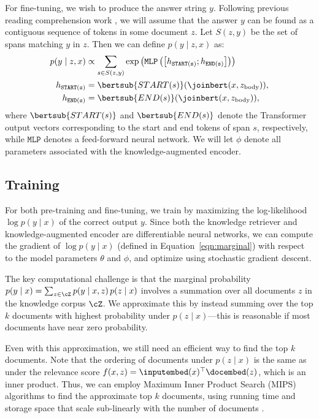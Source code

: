 For \openqa fine-tuning, we wish to produce the answer string $y$. Following previous reading comprehension work \cite{squad,bidaf,rasor,bidaf_plusplus}, we will assume that the answer $y$ can be found as a contiguous sequence of tokens in some document $z$.
Let $S(z, y)$ be the set of spans matching $y$ in $z$. Then we can define $p(y \mid z,x)$ as:
\begin{align*}
p(y \mid z, x)  &\propto \sum_{s \in S(z, y)} \exp\left(\mathtt{MLP}\left(\left[h_{\mathtt{START(s)}} ; h_{\mathtt{END(s)}}\right]\right)\right)\\
h_{\mathtt{START(s)}} &= \bertsub{START(s)}(\joinbert(x, z_\text{body})), \\
h_{\mathtt{END(s)}} &= \bertsub{END(s)}(\joinbert(x, z_\text{body})),
\end{align*}
where $\bertsub{START(s)}$ and $\bertsub{END(s)}$ denote the Transformer output vectors corresponding to the start and end tokens of span $s$, respectively, while $\mathtt{MLP}$ denotes a feed-forward neural network. We will let $\phi$ denote all parameters associated with the knowledge-augmented encoder.

\subsection{Training}
\label{sec:training}

For both pre-training and fine-tuning, we train by maximizing the log-likelihood $\log p(y\mid x)$ of the correct output $y$. Since both the knowledge retriever and knowledge-augmented encoder are differentiable neural networks, we can compute the gradient of $\log p(y\mid x)$ (defined in Equation~\ref{eqn:marginal}) with respect to the model parameters $\theta$ and $\phi$, and optimize using stochastic gradient descent.

The key computational challenge is that the marginal probability
$p(y\mid x) = \sum_{z \in \cZ} p(y\mid x,z)\,p(z \mid x)$
involves a summation over all documents $z$ in the knowledge corpus $\cZ$. We approximate this by instead summing over the top $k$ documents with highest probability under $p(z \mid x)$---this is reasonable if most documents have near zero probability.

Even with this approximation, we still need an efficient way to find the top $k$ documents. %
Note that the ordering of documents under $p(z \mid  x)$ is the same as under the relevance score $f(x, z) = \inputembed(x)^\top \docembed(z)$, which is an inner product. Thus, we can employ Maximum Inner Product Search (MIPS) algorithms to find the approximate top $k$ documents, using running time and storage space that scale sub-linearly with the number of documents \cite{mips_cone,mips_alsh,mips_binary}.

